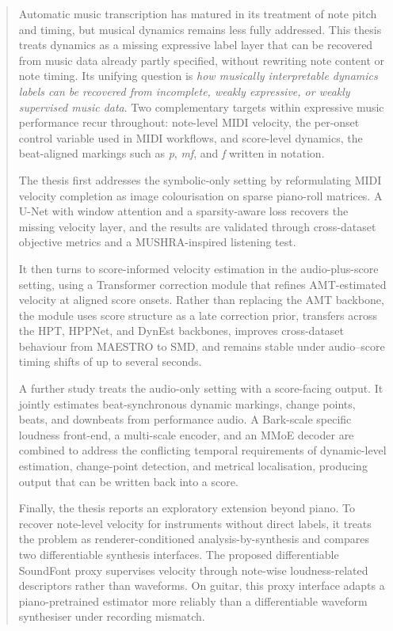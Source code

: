 \documentclass[12pt,a4paper,twoside,openright,final,titlepage]{report}
\begin{document}
    
	\begin{abstract}
	Automatic music transcription has matured in its treatment of note pitch and timing, but musical dynamics remains less fully addressed. This thesis treats dynamics as a missing expressive label layer that can be recovered from music data already partly specified, without rewriting note content or note timing. Its unifying question is \emph{how musically interpretable dynamics labels can be recovered from incomplete, weakly expressive, or weakly supervised music data}. Two complementary targets within expressive music performance recur throughout: note-level MIDI velocity, the per-onset control variable used in MIDI workflows, and score-level dynamics, the beat-aligned markings such as \textit{p}, \textit{mf}, and \textit{f} written in notation.
		
	The thesis first addresses the symbolic-only setting by reformulating MIDI velocity completion as image colourisation on sparse piano-roll matrices. A U-Net with window attention and a sparsity-aware loss recovers the missing velocity layer, and the results are validated through cross-dataset objective metrics and a MUSHRA-inspired listening test.
		
	It then turns to score-informed velocity estimation in the audio-plus-score setting, using a Transformer correction module that refines AMT-estimated velocity at aligned score onsets. Rather than replacing the AMT backbone, the module uses score structure as a late correction prior, transfers across the HPT, HPPNet, and DynEst backbones, improves cross-dataset behaviour from MAESTRO to SMD, and remains stable under audio--score timing shifts of up to several seconds.
		
	A further study treats the audio-only setting with a score-facing output. It jointly estimates beat-synchronous dynamic markings, change points, beats, and downbeats from performance audio. A Bark-scale specific loudness front-end, a multi-scale encoder, and an MMoE decoder are combined to address the conflicting temporal requirements of dynamic-level estimation, change-point detection, and metrical localisation, producing output that can be written back into a score.
		
	Finally, the thesis reports an exploratory extension beyond piano. To recover note-level velocity for instruments without direct labels, it treats the problem as renderer-conditioned analysis-by-synthesis and compares two differentiable synthesis interfaces. The proposed differentiable SoundFont proxy supervises velocity through note-wise loudness-related descriptors rather than waveforms. On guitar, this proxy interface adapts a piano-pretrained estimator more reliably than a differentiable waveform synthesiser under recording mismatch.
		

\end{abstract}
\end{document}
